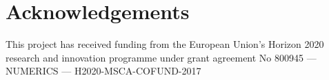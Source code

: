 \chapter*{Acknowledgements}



This project has received funding from the European Union's Horizon 2020 research and innovation programme under grant agreement No 800945 — NUMERICS — H2020-MSCA-COFUND-2017



